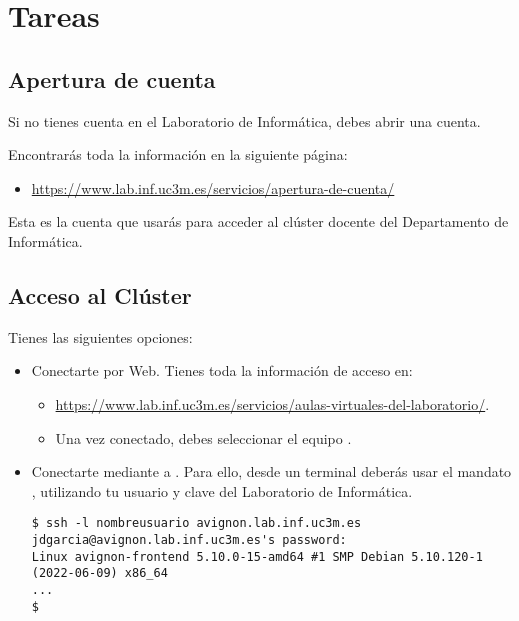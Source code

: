 \section{Tareas}

\subsection{Apertura de cuenta}

Si no tienes cuenta en el Laboratorio de Informática, debes abrir una cuenta.

Encontrarás toda la información en la siguiente página:

\begin{itemize}
  \item \url{https://www.lab.inf.uc3m.es/servicios/apertura-de-cuenta/}
\end{itemize}

Esta es la cuenta que usarás para acceder al clúster docente del Departamento de Informática.

\subsection{Acceso al Clúster}

Tienes las siguientes opciones:


\begin{itemize}
  \item Conectarte por Web. Tienes toda la información de acceso en:
    \begin{itemize}
      \item \url{https://www.lab.inf.uc3m.es/servicios/aulas-virtuales-del-laboratorio/}.
      \item Una vez conectado, debes seleccionar el equipo .
    \end{itemize}

  \item Conectarte mediante  a . Para ello,
        desde un terminal deberás usar el mandato , utilizando tu
        usuario y clave del Laboratorio de Informática.
\begin{lstlisting}[style=terminal]
$ ssh -l nombreusuario avignon.lab.inf.uc3m.es
jdgarcia@avignon.lab.inf.uc3m.es's password: 
Linux avignon-frontend 5.10.0-15-amd64 #1 SMP Debian 5.10.120-1 (2022-06-09) x86_64
...
$
\end{lstlisting}

\end{itemize}

